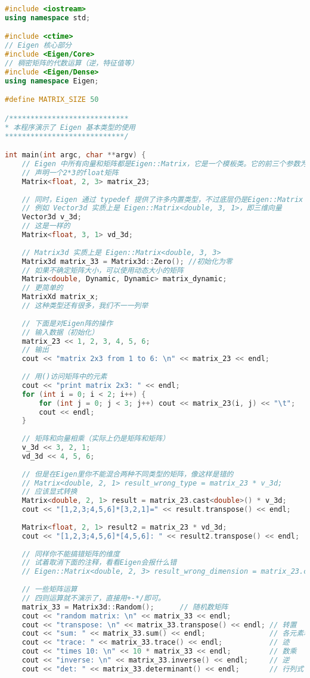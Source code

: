 \begin{lstlisting}[language=c++,caption=slambook2/ch3/useEigen/eigenMatrix.cpp]
#include <iostream>
using namespace std;

#include <ctime>
// Eigen 核心部分
#include <Eigen/Core>
// 稠密矩阵的代数运算（逆，特征值等）
#include <Eigen/Dense>
using namespace Eigen;

#define MATRIX_SIZE 50

/****************************
* 本程序演示了 Eigen 基本类型的使用
****************************/

int main(int argc, char **argv) {
	// Eigen 中所有向量和矩阵都是Eigen::Matrix，它是一个模板类。它的前三个参数为：数据类型，行，列
	// 声明一个2*3的float矩阵
	Matrix<float, 2, 3> matrix_23;
	
	// 同时，Eigen 通过 typedef 提供了许多内置类型，不过底层仍是Eigen::Matrix
	// 例如 Vector3d 实质上是 Eigen::Matrix<double, 3, 1>，即三维向量
	Vector3d v_3d;
	// 这是一样的
	Matrix<float, 3, 1> vd_3d;
	
	// Matrix3d 实质上是 Eigen::Matrix<double, 3, 3>
	Matrix3d matrix_33 = Matrix3d::Zero(); //初始化为零
	// 如果不确定矩阵大小，可以使用动态大小的矩阵
	Matrix<double, Dynamic, Dynamic> matrix_dynamic;
	// 更简单的
	MatrixXd matrix_x;
	// 这种类型还有很多，我们不一一列举
	
	// 下面是对Eigen阵的操作
	// 输入数据（初始化）
	matrix_23 << 1, 2, 3, 4, 5, 6;
	// 输出
	cout << "matrix 2x3 from 1 to 6: \n" << matrix_23 << endl;
	
	// 用()访问矩阵中的元素
	cout << "print matrix 2x3: " << endl;
	for (int i = 0; i < 2; i++) {
		for (int j = 0; j < 3; j++) cout << matrix_23(i, j) << "\t";
		cout << endl;
	}
	
	// 矩阵和向量相乘（实际上仍是矩阵和矩阵）
	v_3d << 3, 2, 1;
	vd_3d << 4, 5, 6;
	
	// 但是在Eigen里你不能混合两种不同类型的矩阵，像这样是错的
	// Matrix<double, 2, 1> result_wrong_type = matrix_23 * v_3d;
	// 应该显式转换
	Matrix<double, 2, 1> result = matrix_23.cast<double>() * v_3d;
	cout << "[1,2,3;4,5,6]*[3,2,1]=" << result.transpose() << endl;
	
	Matrix<float, 2, 1> result2 = matrix_23 * vd_3d;
	cout << "[1,2,3;4,5,6]*[4,5,6]: " << result2.transpose() << endl;
	
	// 同样你不能搞错矩阵的维度
	// 试着取消下面的注释，看看Eigen会报什么错
	// Eigen::Matrix<double, 2, 3> result_wrong_dimension = matrix_23.cast<double>() * v_3d;
	
	// 一些矩阵运算
	// 四则运算就不演示了，直接用+-*/即可。
	matrix_33 = Matrix3d::Random();      // 随机数矩阵
	cout << "random matrix: \n" << matrix_33 << endl;
	cout << "transpose: \n" << matrix_33.transpose() << endl; // 转置
	cout << "sum: " << matrix_33.sum() << endl;               // 各元素和
	cout << "trace: " << matrix_33.trace() << endl;           // 迹
	cout << "times 10: \n" << 10 * matrix_33 << endl;         // 数乘
	cout << "inverse: \n" << matrix_33.inverse() << endl;     // 逆
	cout << "det: " << matrix_33.determinant() << endl;       // 行列式
	

\end{lstlisting}
